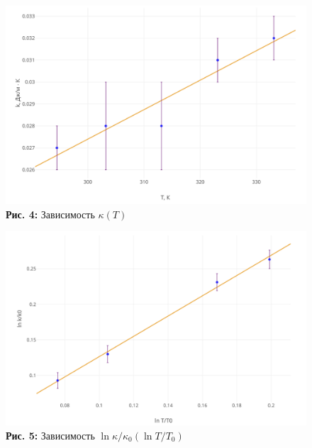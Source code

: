 \documentclass[12pt,a4paper]{scrartcl}
\begin{document}
	\begin{center}
		\begin{figure}[h]
			\begin{minipage}{0.5\linewidth}
				\begin{center}
					\includegraphics[scale=0.15]{PIC_4}
					\\\textbf{Рис. 4:} Зависимость $\kappa(T)$
				\end{center}
			\end{minipage}
			\begin{minipage}{0.5\linewidth}
				\begin{center}
					\includegraphics[scale=0.15]{PIC_5}
					\\\textbf{Рис. 5:} Зависимость $\ln \kappa/\kappa_0(\ln T/T_0)$
				\end{center}
			\end{minipage}
		\end{figure}
	\end{center}
	
\end{document}
